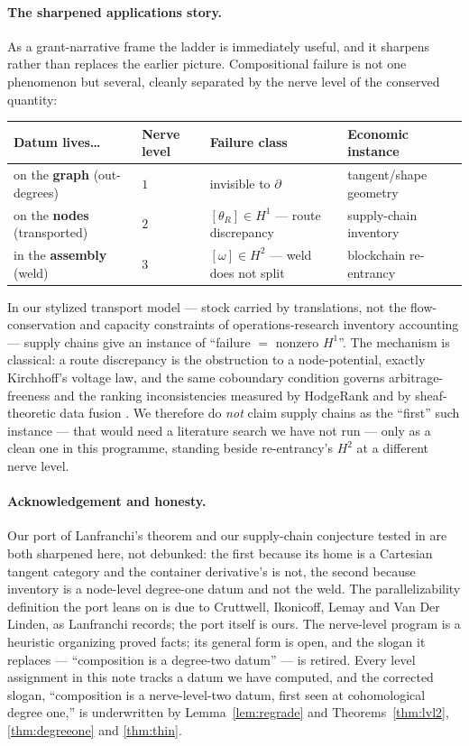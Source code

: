 \documentclass[11pt]{article}
\theoremstyle{definition}
\begin{document}
\paragraph{The sharpened applications story.}
As a grant-narrative frame the ladder is immediately useful, and it sharpens rather than replaces the
earlier picture. Compositional failure is not one phenomenon but several, cleanly separated by the
nerve level of the conserved quantity:
\begin{center}
\begin{tabular}{@{}llll@{}}
\toprule
Datum lives\ldots & Nerve level & Failure class & Economic instance \\
\midrule
on the \textbf{graph} (out-degrees) & $1$ & invisible to $\partial$ & tangent/shape geometry \\
on the \textbf{nodes} (transported) & $2$ & $[\theta_R]\in H^1$ --- route discrepancy & supply-chain inventory \\
in the \textbf{assembly} (weld) & $3$ & $[\omega]\in H^2$ --- weld does not split & blockchain re-entrancy \\
\bottomrule
\end{tabular}
\end{center}
In our stylized transport model --- stock carried by translations, not the flow-conservation and
capacity constraints of operations-research inventory accounting --- supply chains give an instance of
``failure $=$ nonzero $H^1$''. The mechanism is classical: a route discrepancy is the obstruction to a
node-potential, exactly Kirchhoff's voltage law, and the same coboundary condition governs
arbitrage-freeness and the ranking inconsistencies measured by HodgeRank \cite{HodgeRank} and by
sheaf-theoretic data fusion \cite{Ghrist}. We therefore do \emph{not} claim supply chains as the
``first'' such instance --- that would need a literature search we have not run --- only as a clean one
in this programme, standing beside re-entrancy's $H^2$ at a different nerve level.

\paragraph{Acknowledgement and honesty.}
Our port of Lanfranchi's theorem \cite{Lanfranchi2026} and our supply-chain conjecture tested in
\cite{MacBethSupplyChain} are both sharpened here, not debunked: the first because its home is a
Cartesian tangent category and the container derivative's is not, the second because inventory is a
node-level degree-one datum and not the weld. The parallelizability definition the port leans on is due
to Cruttwell, Ikonicoff, Lemay and Van Der Linden, as Lanfranchi records; the port itself is ours. The
nerve-level program is a heuristic organizing proved facts; its general form is open, and the slogan it
replaces --- ``composition is a degree-two datum'' --- is retired. Every level assignment in this note
tracks a datum we have computed, and the corrected slogan, ``composition is a nerve-level-two datum,
first seen at cohomological degree one,'' is underwritten by Lemma~\ref{lem:regrade} and
Theorems~\ref{thm:lvl2}, \ref{thm:degreeone} and \ref{thm:thin}.
\end{document}
